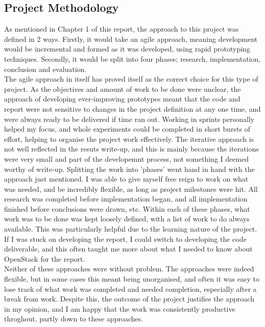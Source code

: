 \subsection{Project Methodology}
As mentioned in Chapter 1 of this report, the approach to this project was defined in 2 ways. Firstly, it would take an agile approach, meaning development would be incremental and formed as it was developed, using rapid prototyping techniques. Secondly, it would be split into four phases; research, implementation, conclusion and evaluation.  \\
The agile approach in itself has proved itself as the correct choice for this type of project. As the objectives and amount of work to be done were unclear, the approach of developing ever-improving prototypes meant that the code and report were not sensitive to changes in the project definition at any one time, and were always ready to be delivered if time ran out. Working in sprints personally helped my focus, and whole experiments could be completed in short bursts of effort, helping to organise the project work effectively. The iterative approach is not well reflected in the resuts write-up, and this is mainly because the iterations were very small and part of the developemnt process, not something I deemed worthy of write-up.  Splitting the work into 'phases' went hand in hand with the approach just mentioned. I was able to give myself free reign to work on what was needed, and be incredibly flexible, as long as project milestones were hit. All research was completed before implementation began, and all implementation finished before conclusions were drawn, etc. Within each of these phases, what work was to be done was kept loosely defined, with a list of work to do always available. This was particularly helpful due to the learning nature of the project. If I was stuck on developing the report, I could switch to developing the code deliverable, and this often taught me more about what I needed to know about OpenStack for the report. \\
Neither of these approaches were without problem. The approaches were indeed flexible, but in some cases this meant being unorganised, and often it was easy to lose track of what work was completed and needed completion, especially after a break from work. Despite this, the outcome of the project justifies the approach in my opinion, and I am happy that the work was consistently productive throghout, partly down to these approaches. 

